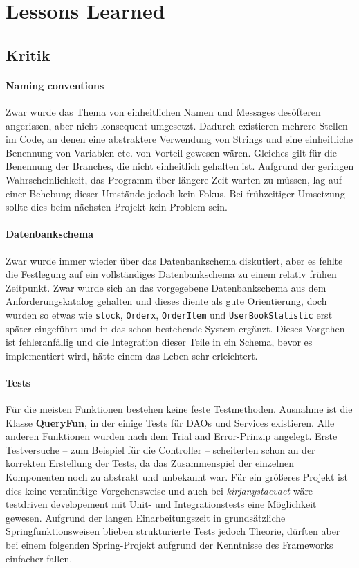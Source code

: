\section{Lessons Learned}

	\subsection{Kritik}	
		\paragraph{Naming conventions} Zwar wurde das Thema von einheitlichen Namen und Messages desöfteren angerissen, aber nicht konsequent umgesetzt. Dadurch existieren mehrere Stellen im Code, an denen eine abstraktere Verwendung von Strings und eine einheitliche Benennung von Variablen etc. von Vorteil gewesen wären. Gleiches gilt für die Benennung der Branches, die nicht einheitlich gehalten ist. Aufgrund der geringen Wahrscheinlichkeit, das Programm über längere Zeit warten zu müssen, lag auf einer Behebung dieser Umstände jedoch kein Fokus. Bei frühzeitiger Umsetzung sollte dies beim nächsten Projekt kein Problem sein.
		
		\paragraph{Datenbankschema} Zwar wurde immer wieder über das Datenbankschema diskutiert, aber es fehlte die Festlegung auf ein vollständiges Datenbankschema zu einem relativ frühen Zeitpunkt. Zwar wurde sich an das vorgegebene Datenbankschema aus dem Anforderungskatalog gehalten und dieses diente als gute Orientierung, doch wurden so etwas wie \texttt{stock}, \texttt{Orderx}, \texttt{OrderItem} und \texttt{UserBookStatistic} erst später eingeführt und in das schon bestehende System ergänzt. Dieses Vorgehen ist fehleranfällig und die Integration dieser Teile in ein Schema, bevor es implementiert wird, hätte einem das Leben sehr erleichtert.
		
		\paragraph{Tests} Für die meisten Funktionen bestehen keine feste Testmethoden. Ausnahme ist die Klasse \textbf{QueryFun}, in der einige Tests für DAOs und Services existieren. Alle anderen Funktionen wurden nach dem Trial and Error-Prinzip angelegt. Erste Testversuche -- zum Beispiel für die Controller -- scheiterten schon an der korrekten Erstellung der Tests, da das Zusammenspiel der einzelnen Komponenten noch zu abstrakt und unbekannt war. Für ein größeres Projekt ist dies keine vernünftige Vorgehensweise und auch bei \textit{kirjanystaevaet} wäre testdriven developement mit Unit- und Integrationstests eine Möglichkeit gewesen. Aufgrund der langen Einarbeitungszeit in grundsätzliche Springfunktionsweisen blieben strukturierte Tests jedoch Theorie, dürften aber bei einem folgenden Spring-Projekt aufgrund der Kenntnisse des Frameworks einfacher fallen.

